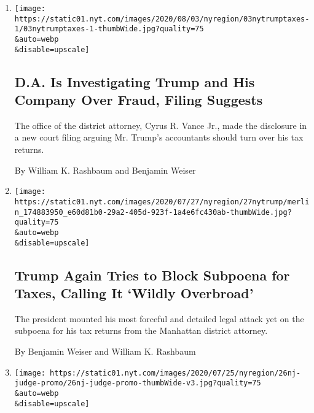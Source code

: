 \begin{enumerate}
\def\labelenumi{\arabic{enumi}.}
\item
  \href{/2020/08/03/nyregion/donald-trump-taxes-cyrus-vance.html}{}

  \texttt{[image: https://static01.nyt.com/images/2020/08/03/nyregion/03nytrumptaxes-1/03nytrumptaxes-1-thumbWide.jpg?quality=75\\\&auto=webp\\\&disable=upscale]}

  \hypertarget{da-is-investigating-trump-and-his-company-over-fraud-filing-suggests}{%
  \subsection{D.A. Is Investigating Trump and His Company Over Fraud,
  Filing
  Suggests}\label{da-is-investigating-trump-and-his-company-over-fraud-filing-suggests}}

  The office of the district attorney, Cyrus R. Vance Jr., made the
  disclosure in a new court filing arguing Mr. Trump's accountants
  should turn over his tax returns.

  By William K. Rashbaum and Benjamin Weiser
\item
  \href{/2020/07/27/nyregion/donald-trump-taxes-cyrus-vance.html}{}

  \texttt{[image: https://static01.nyt.com/images/2020/07/27/nyregion/27nytrump/merlin\_174883950\_e60d81b0-29a2-405d-923f-1a4e6fc430ab-thumbWide.jpg?quality=75\\\&auto=webp\\\&disable=upscale]}

  \hypertarget{trump-again-tries-to-block-subpoena-for-taxes-calling-it-wildly-overbroad}{%
  \subsection{Trump Again Tries to Block Subpoena for Taxes, Calling It
  `Wildly
  Overbroad'}\label{trump-again-tries-to-block-subpoena-for-taxes-calling-it-wildly-overbroad}}

  The president mounted his most forceful and detailed legal attack yet
  on the subpoena for his tax returns from the Manhattan district
  attorney.

  By Benjamin Weiser and William K. Rashbaum
\item
  \href{/2020/07/26/nyregion/roy-den-hollander-judge.html}{}

  \texttt{[image: https://static01.nyt.com/images/2020/07/25/nyregion/26nj-judge-promo/26nj-judge-promo-thumbWide-v3.jpg?quality=75\\\&auto=webp\\\&disable=upscale]}


\end{enumerate}
